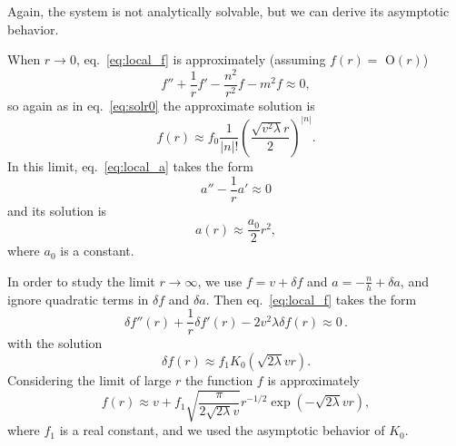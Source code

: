 Again, the system is not analytically solvable, but we can derive its asymptotic behavior.

When $r \to 0$, eq.\ \eqref{eq:local_f} is approximately (assuming $f(r) = $ O$(r)$)
\begin{equation}
	 f'' + \frac{1}{r} f'  -\frac{n^2}{r^2}f -m^2 f\approx 0, 
\end{equation}
so again as in eq.\ \eqref{eq:solr0} the approximate solution is 
\begin{equation}
	f(r) \approx f_0 \frac{1}{|n|!}\left(\frac{\sqrt{v^2 \lambda}r}{2}\right)^{|n|} .
\end{equation}
In this limit, eq.\ \eqref{eq:local_a} takes the form
\begin{equation}
	a'' - \frac{1}{r}a' \approx 0
\end{equation}
and its solution is
\begin{equation}
	a(r) \approx \frac{a_0}{2}r^2,
\end{equation}
where $a_0$ is a constant.

In order to study the limit $r\to\infty$, we use $f = v + \delta f$ and $a = -\frac{n}{h} + \delta a$, and ignore quadratic terms in $\delta f$ and $\delta a$. Then eq.\ \eqref{eq:local_f} takes the form
\begin{equation}
	\delta f''(r) +\frac{1}{r}\delta f'(r)-2v^2\lambda\delta f(r) \approx 0\, .
\end{equation}
with the solution 
\begin{equation}
	\delta f(r) \approx f_1 K_0(\sqrt{2\lambda}v r).
\end{equation}
Considering the limit of large $r$ the function $f$ is approximately
\begin{equation}
	f (r)\approx v + f_1\sqrt{\frac{\pi}{2\sqrt{2\lambda}v}} r^{-1/2}\exp \left(-\sqrt{2\lambda}v r\right),
\end{equation}
where $f_1$ is a real constant, and we used the asymptotic behavior of $K_0$.

